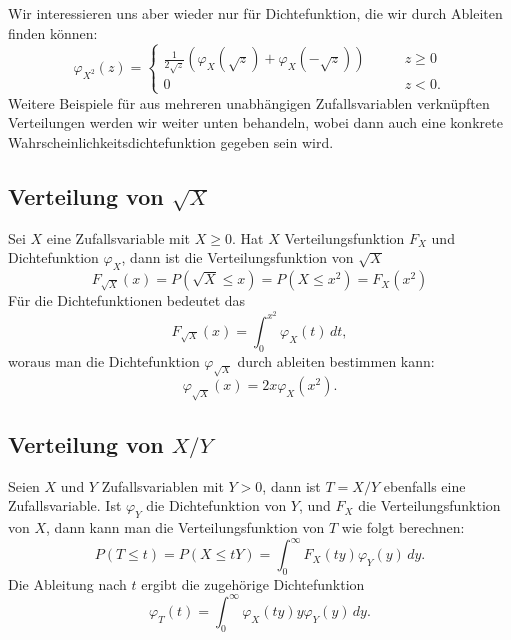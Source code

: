 Wir interessieren uns aber wieder nur für Dichtefunktion, die wir
durch Ableiten finden können:
\[
\varphi_{X^2}(z)=\begin{cases}
\frac{1}{2\sqrt{z}}\left(\varphi_X(\sqrt{z})+\varphi_X(-\sqrt{z})\right)&\qquad z\ge 0\\
0&\qquad z<0.
\end{cases}
\]
Weitere Beispiele für aus mehreren unabhängigen Zufallsvariablen
verknüpften Verteilungen werden wir weiter unten behandeln, wobei
dann auch eine konkrete Wahrscheinlichkeitsdichtefunktion gegeben sein
wird.

\subsection{Verteilung von \texorpdfstring{$\sqrt{X}$}{Wurzel X}} \label{verteilungsfunktion-wurzel}
Sei $X$ eine Zufallsvariable mit $X\ge 0$.
Hat $X$ Verteilungsfunktion $F_X$
und Dichtefunktion
$\varphi_X$, dann ist die Verteilungsfunktion von $\sqrt{X}$
\[
F_{\sqrt{X}}(x)=P(\sqrt{X}\le x)=P(X\le x^2)=F_X(x^2)
\]
Für die Dichtefunktionen bedeutet das
\[
F_{\sqrt{X}}(x)=\int_0^{x^2}\varphi_X(t)\,dt,
\]
woraus man die Dichtefunktion $\varphi_{\sqrt{X}}$ durch ableiten
bestimmen kann:
\[
\varphi_{\sqrt{X}}(x)=2x\varphi_X(x^2).
\]

\subsection{Verteilung von \texorpdfstring{$X/Y$}{X/Y}} \label{verteilungsfunktion-quotient}
Seien $X$ und $Y$ Zufallsvariablen mit $Y>0$, dann ist $T=X/Y$ ebenfalls
eine Zufallsvariable.
Ist $\varphi_Y$ die Dichtefunktion von $Y$,
und $F_X$ die Verteilungsfunktion von $X$, dann kann man die
Verteilungsfunktion von $T$ wie folgt berechnen:
\[
P(T\le t)=P(X\le tY)=\int_0^\infty F_X(ty)\varphi_Y(y)\,dy.
\]
Die Ableitung nach $t$ ergibt die zugehörige Dichtefunktion
\[
\varphi_T(t)=\int_0^\infty\varphi_X(ty)y\varphi_Y(y)\,dy.
\]

